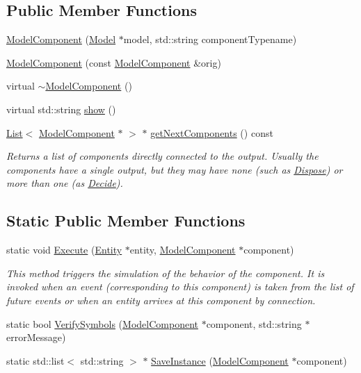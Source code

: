 \subsection*{Public Member Functions}
\begin{DoxyCompactItemize}
\item 
\hyperlink{class_model_component_adb9a28a0a9780f1852bee781761fef6a}{Model\+Component} (\hyperlink{class_model}{Model} $\ast$model, std\+::string component\+Typename)
\item 
\hyperlink{class_model_component_a5b95933e7a265039eb01f6ec88d92675}{Model\+Component} (const \hyperlink{class_model_component}{Model\+Component} \&orig)
\item 
virtual \hyperlink{class_model_component_a6d490d6a2fdf66ad13ed8adcc39ec611}{$\sim$\+Model\+Component} ()
\item 
virtual std\+::string \hyperlink{class_model_component_ad8bc846e36b028eab7efb7da6c549eca}{show} ()
\item 
\hyperlink{class_list}{List}$<$ \hyperlink{class_model_component}{Model\+Component} $\ast$ $>$ $\ast$ \hyperlink{class_model_component_a89fe8e3fb064c68aebbecd36eeed7d43}{get\+Next\+Components} () const 
\begin{DoxyCompactList}\small\item\em Returns a list of components directly connected to the output. Usually the components have a single output, but they may have none (such as \hyperlink{class_dispose}{Dispose}) or more than one (as \hyperlink{class_decide}{Decide}). \end{DoxyCompactList}\end{DoxyCompactItemize}
\subsection*{Static Public Member Functions}
\begin{DoxyCompactItemize}
\item 
static void \hyperlink{class_model_component_a08c5312c2f94f6621577cc1836c2d3e0}{Execute} (\hyperlink{class_entity}{Entity} $\ast$entity, \hyperlink{class_model_component}{Model\+Component} $\ast$component)
\begin{DoxyCompactList}\small\item\em This method triggers the simulation of the behavior of the component. It is invoked when an event (corresponding to this component) is taken from the list of future events or when an entity arrives at this component by connection. \end{DoxyCompactList}\item 
static bool \hyperlink{class_model_component_a0798a220cf903b34ce28c40e136d207d}{Verify\+Symbols} (\hyperlink{class_model_component}{Model\+Component} $\ast$component, std\+::string $\ast$error\+Message)
\item 
static std\+::list$<$ std\+::string $>$ $\ast$ \hyperlink{class_model_component_a45d3805f9b7051b7acc142e5d85cded6}{Save\+Instance} (\hyperlink{class_model_component}{Model\+Component} $\ast$component)
\end{DoxyCompactItemize}
